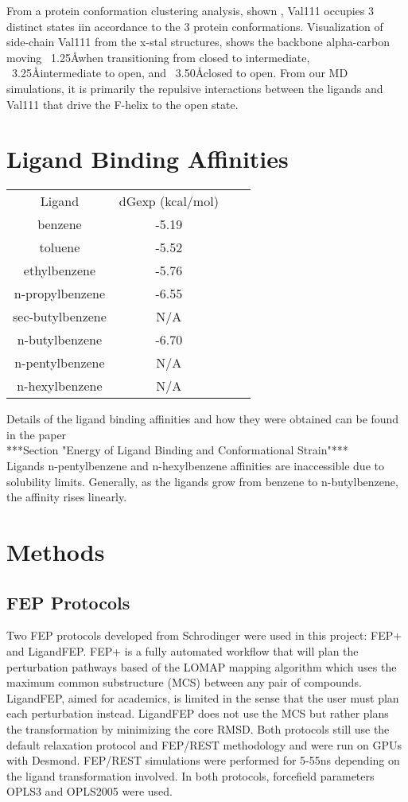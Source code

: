\documentclass{article}
\begin{document}
From a protein conformation clustering analysis, shown \cite{Merski2015}, Val111 occupies 3 distinct states iin accordance to the 3 protein conformations.
Visualization of side-chain Val111 from the x-stal structures, shows the backbone alpha-carbon moving ~1.25\AA when transitioning from closed to intermediate, ~3.25\AA intermediate to open, and ~3.50\AA closed to open.
From our MD simulations, it is primarily the repulsive interactions between the ligands and Val111 that drive the F-helix to the open state.

\section{Ligand Binding Affinities}
\begin{tabular}{|c|c|c|c|}
\hline
Ligand           & dGexp (kcal/mol) \\
benzene          & -5.19            \\
toluene          & -5.52            \\
ethylbenzene     & -5.76            \\
n-propylbenzene  & -6.55            \\
sec-butylbenzene & N/A              \\
n-butylbenzene   & -6.70            \\
n-pentylbenzene  & N/A              \\
n-hexylbenzene   & N/A              \\
\hline
\end{tabular}

Details of the ligand binding affinities and how they were obtained can be found in the paper \cite{Merski2015} \\
***Section "Energy of Ligand Binding and Conformational Strain"***\\
Ligands n-pentylbenzene and n-hexylbenzene affinities are inaccessible due to solubility limits.
Generally, as the ligands grow from benzene to n-butylbenzene, the affinity rises linearly.

\section{Methods}
\subsection{FEP Protocols}
Two FEP protocols developed from Schrodinger were used in this project: FEP+ and LigandFEP.
FEP+ is a fully automated workflow that will plan the perturbation pathways based of the LOMAP mapping algorithm which uses the maximum common substructure (MCS) between any pair of compounds.
LigandFEP, aimed for academics, is limited in the sense that the user must plan each perturbation instead. 
LigandFEP does not use the MCS but rather plans the transformation by minimizing the core RMSD.
Both protocols still use the default relaxation protocol and FEP/REST methodology and were run on GPUs with Desmond.
FEP/REST simulations were performed for 5-55ns depending on the ligand transformation involved. 
In both protocols, forcefield parameters OPLS3 and OPLS2005 were used.\\
\end{document}
